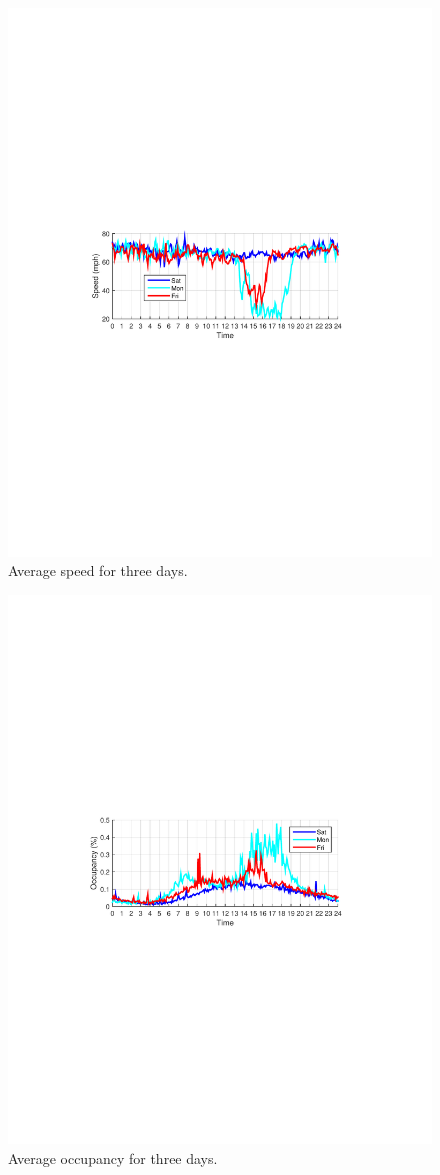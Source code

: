 \documentclass[twocolumn,10pt]{asme2e}
\begin{document}
\begin{figure}[h]
	\centering
	\includegraphics[width=0.7\linewidth]{./Figures/spd1}
	\caption{Average speed for three days.}
	\label{fig:spd1}
\end{figure} 

\begin{figure}[h]
	\centering
	\includegraphics[width=0.7\linewidth]{./Figures/occ1}
	\caption{Average occupancy for three days.}
	\label{fig:occ1}
\end{figure} 
\end{document}
